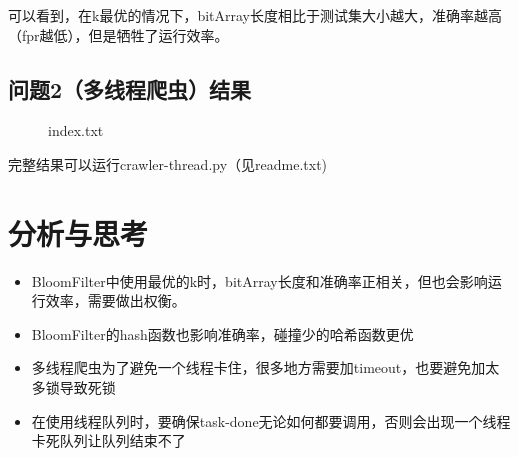 \documentclass[12pt,a4paper]{article}
\begin{document}
可以看到，在k最优的情况下，bitArray长度相比于测试集大小越大，准确率越高（fpr越低），但是牺牲了运行效率。
\subsection{问题2（多线程爬虫）结果}
\begin{figure}[H]
\end{figure}
\begin{figure}[H]
\end{figure}
\begin{figure}[H]
	 \caption{index.txt}
\end{figure}

完整结果可以运行crawler-thread.py（见readme.txt)


\section{分析与思考}
\begin{itemize}
	\item BloomFilter中使用最优的k时，bitArray长度和准确率正相关，但也会影响运行效率，需要做出权衡。
	\item BloomFilter的hash函数也影响准确率，碰撞少的哈希函数更优
	\item 多线程爬虫为了避免一个线程卡住，很多地方需要加timeout，也要避免加太多锁导致死锁
	\item 在使用线程队列时，要确保task-done无论如何都要调用，否则会出现一个线程卡死队列让队列结束不了
\end{itemize}
\end{document}
